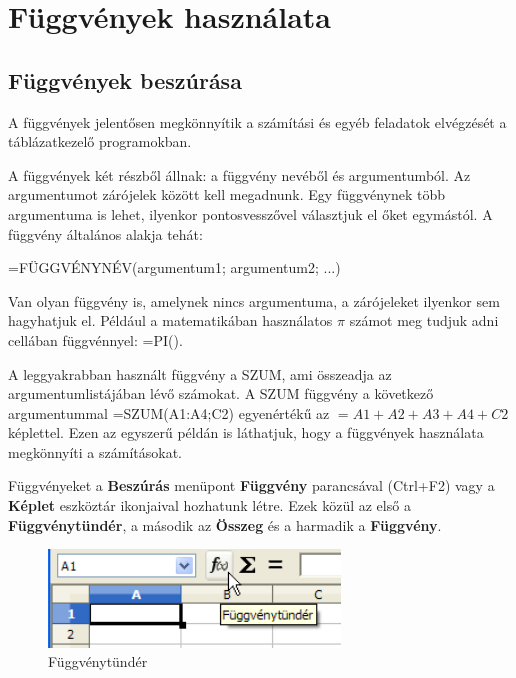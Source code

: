 \chapter{Függvények használata}
\thispagestyle{empty}

\section{Függvények beszúrása}

A függvények jelentősen megkönnyítik a számítási és
egyéb feladatok elvégzését a táblázatkezelő
programokban.

A függvények két részből állnak: a függvény
nevéből és argumentumból. Az argumentumot zárójelek
között kell megadnunk. Egy függvénynek több argumentuma is
lehet, ilyenkor pontosvesszővel választjuk el őket
egymástól. A függvény általános alakja tehát:
\begin{center}
=FÜGGVÉNYNÉV(argumentum1; argumentum2; ...)
\end{center}

Van olyan függvény is, amelynek nincs argumentuma, a zárójeleket
ilyenkor sem hagyhatjuk el. Például a matematikában használatos
${\pi}$ számot meg tudjuk adni cellában függvénnyel: =PI().

A leggyakrabban használt függvény a SZUM, ami összeadja az
argumentumlistájában lévő számokat. A SZUM függvény a
következő argumentummal =SZUM(A1:A4;C2) egyenértékű az
$=A1+A2+A3+A4+C2$ képlettel. Ezen az egyszerű példán is
láthatjuk, hogy a függvények használata megkönnyíti a
számításokat.

Függvényeket a \textbf{Beszúrás} menüpont
\textbf{Függvény} parancsával (Ctrl+F2) vagy a \textbf{Képlet}
eszköztár ikonjaival hozhatunk létre. Ezek közül az első
a \textbf{Függvénytündér}, a második az \textbf{Összeg}
és a harmadik a \textbf{Függvény}.

\begin{figure}[!h]
\begin{center}
\includegraphics[width=7.751cm]{oocalcv2-img32.png}
\caption{Függvénytündér}\label{Függvénytündér}
\end{center}
\end{figure}

